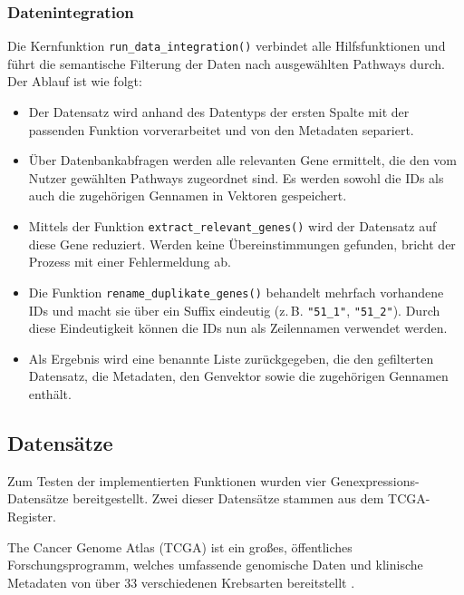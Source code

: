 \documentclass[12pt]{article}
\begin{document}
\subsubsection{Datenintegration}
\label{subsec:semantische_integration}

\noindent Die Kernfunktion \texttt{run\_data\_integration()} verbindet alle Hilfsfunktionen und führt die semantische Filterung der Daten nach ausgewählten Pathways durch. Der Ablauf ist wie folgt:

\begin{itemize}
    \item Der Datensatz wird anhand des Datentyps der ersten Spalte mit der passenden Funktion vorverarbeitet und von den Metadaten separiert.
    \item Über Datenbankabfragen werden alle relevanten Gene ermittelt, die den vom Nutzer gewählten Pathways zugeordnet sind. Es werden sowohl die IDs als auch die zugehörigen Gennamen in Vektoren gespeichert.
    \item Mittels der Funktion \texttt{extract\_relevant\_genes()} wird der Datensatz auf diese Gene reduziert. Werden keine Übereinstimmungen gefunden, bricht der Prozess mit einer Fehlermeldung ab. 
    \item Die Funktion \texttt{rename\_duplikate\_genes()} behandelt mehrfach vorhandene IDs und macht sie über ein Suffix eindeutig (z.\,B. \texttt{"51\_1"}, \texttt{"51\_2"}). Durch diese Eindeutigkeit können die IDs nun als Zeilennamen verwendet werden.
    \item Als Ergebnis wird eine benannte Liste zurückgegeben, die den gefilterten Datensatz, die Metadaten, den Genvektor sowie die zugehörigen Gennamen enthält.
\end{itemize}

\subsection{Datensätze}

\noindent Zum Testen der implementierten Funktionen wurden vier Genexpressions-Datensätze bereitgestellt. Zwei dieser Datensätze stammen aus dem TCGA-Register. 

\noindent The Cancer Genome Atlas (TCGA) ist ein großes, öffentliches Forschungsprogramm, welches umfassende genomische Daten und klinische Metadaten von über 33 verschiedenen Krebsarten bereitstellt \cite{TCGA_PanCancer_2013}. 
\end{document}
